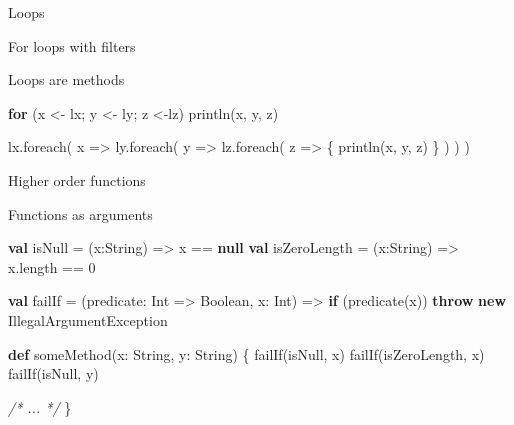 \documentclass[ignorenonframetext,]{beamer}
\newenvironment{Shaded}{\begin{snugshade}}{\end{snugshade}}
\newcommand{\KeywordTok}[1]{\textcolor[rgb]{0.13,0.29,0.53}{\textbf{#1}}}
\newcommand{\DecValTok}[1]{\textcolor[rgb]{0.00,0.00,0.81}{#1}}
\newcommand{\CommentTok}[1]{\textcolor[rgb]{0.56,0.35,0.01}{\textit{#1}}}
\newcommand{\FunctionTok}[1]{\textcolor[rgb]{0.00,0.00,0.00}{#1}}
\newcommand{\NormalTok}[1]{#1}
\begin{document}
\begin{frame}[fragile]{Loops}
\begin{block}{For loops with filters}
\begin{Shaded}
\begin{Highlighting}[]
{\KeywordTok{for}\NormalTok{ (i <- }\DecValTok{1}\NormalTok{ until }\DecValTok{10} \KeywordTok{if}\NormalTok{ i %
    \FunctionTok{println}\NormalTok{(i)}
\end{Highlighting}
\end{Shaded}

\end{block}

\begin{block}{Loops are methods}

\begin{Shaded}
\begin{Highlighting}[]
\KeywordTok{for}\NormalTok{ (x <- lx; y <- ly; z <-lz)}
    \FunctionTok{println}\NormalTok{(x, y, z)}

\NormalTok{lx.}\FunctionTok{foreach}\NormalTok{(}
\NormalTok{    x => ly.}\FunctionTok{foreach}\NormalTok{(}
\NormalTok{        y => lz.}\FunctionTok{foreach}\NormalTok{(}
\NormalTok{            z => \{}
                \FunctionTok{println}\NormalTok{(x, y, z)}
\NormalTok{            \}}
\NormalTok{        )}
\NormalTok{    )}
\NormalTok{)}
\end{Highlighting}
\end{Shaded}

\end{block}

\begin{block}{Higher order functions}

Functions as arguments

\begin{Shaded}
\begin{Highlighting}[]
\KeywordTok{val}\NormalTok{ isNull = (x:String) => x == }\KeywordTok{null}
\KeywordTok{val}\NormalTok{ isZeroLength = (x:String) => x.}\FunctionTok{length}\NormalTok{ == }\DecValTok{0}

\KeywordTok{val}\NormalTok{ failIf = (predicate: Int => Boolean, x: Int) => }
  \KeywordTok{if}\NormalTok{ (}\FunctionTok{predicate}\NormalTok{(x)) }
    \KeywordTok{throw} \KeywordTok{new}\NormalTok{ IllegalArgumentException}
    
\KeywordTok{def} \FunctionTok{someMethod}\NormalTok{(x: String, y: String) \{}
  \FunctionTok{failIf}\NormalTok{(isNull, x)}
  \FunctionTok{failIf}\NormalTok{(isZeroLength, x)}
  \FunctionTok{failIf}\NormalTok{(isNull, y)}
  
  \CommentTok{/* ... */}
\NormalTok{\}}
\end{Highlighting}
\end{Shaded}


\end{block}
\end{frame}
\end{document}
